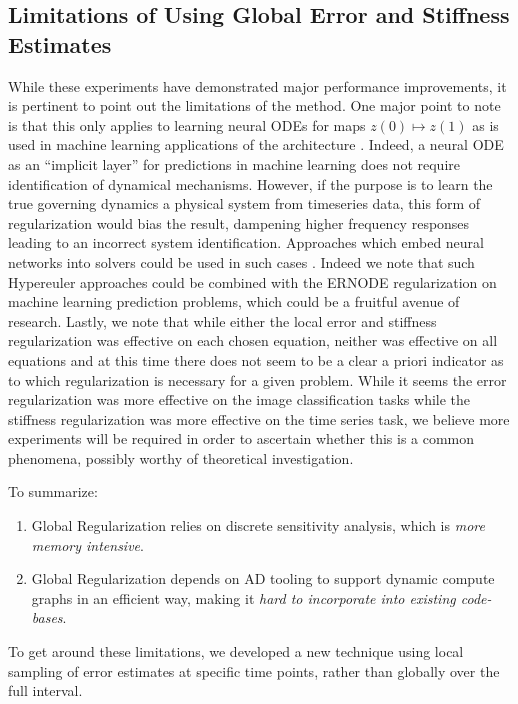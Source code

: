 \subsection{Limitations of Using Global Error and Stiffness Estimates}
\label{subsec:limitations_of_using_global_error_and_stiffness_estimates}

While these experiments have demonstrated major performance improvements, it is pertinent to point out the limitations of the method. One major point to note is that this only applies to learning neural ODEs for maps $z(0) \mapsto z(1)$ as is used in machine learning applications of the architecture \cite{chen2018neural}. Indeed, a neural ODE as an ``implicit layer'' for predictions in machine learning does not require identification of dynamical mechanisms. However, if the purpose is to learn the true governing dynamics a physical system from timeseries data, this form of regularization would bias the result, dampening higher frequency responses leading to an incorrect system identification. Approaches which embed neural networks into solvers could be used in such cases \cite{shen2020deep,poli2020hypersolvers}. Indeed we note that such Hypereuler approaches could be combined with the ERNODE regularization on machine learning prediction problems, which could be a fruitful avenue of research. Lastly, we note that while either the local error and stiffness regularization was effective on each chosen equation, neither was effective on all equations and at this time there does not seem to be a clear a priori indicator as to which regularization is necessary for a given problem. While it seems the error regularization was more effective on the image classification tasks while the stiffness regularization was more effective on the time series task, we believe more experiments will be required in order to ascertain whether this is a common phenomena, possibly worthy of theoretical investigation.

To summarize:
%
\begin{enumerate}
    \item Global Regularization relies on discrete sensitivity analysis, which is \textit{more memory intensive}.
    \item Global Regularization depends on AD tooling to support dynamic compute graphs in an efficient way, making it \textit{hard to incorporate into existing code-bases}.
\end{enumerate}
%
To get around these limitations, we developed a new technique using local sampling of error estimates at specific time points, rather than globally over the full interval.

